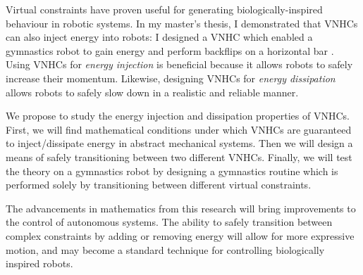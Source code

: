 \documentclass[a4paper,12pt]{article}
\begin{document}
Virtual constraints have proven useful for generating biologically-inspired
behaviour in robotic systems.
In my master's thesis, I demonstrated that VNHCs can also inject energy into
robots:
I designed a VNHC which enabled a gymnastics robot to gain energy
and perform backflips on a horizontal bar \cite{my-thesis}.
Using VNHCs for \textit{energy injection} is beneficial because it allows robots to
safely increase their momentum.
Likewise, designing VNHCs for \textit{energy dissipation} allows robots to
safely slow down in a realistic and reliable manner. 

We propose to study the energy injection and dissipation properties of VNHCs.
First, we will find mathematical conditions under which VNHCs are guaranteed to
inject/dissipate energy in abstract mechanical systems.
Then we will design a means of safely transitioning between two different VNHCs.
Finally, we will test the theory on a gymnastics robot by designing a gymnastics
routine which is performed solely by transitioning between different virtual
constraints.

The advancements in mathematics from this research will bring improvements to
the control of autonomous systems. 
The ability to safely transition between complex constraints by adding or
removing energy will allow for more expressive motion, and may become a standard
technique for controlling biologically inspired robots.

\printbibliography
\end{document}
